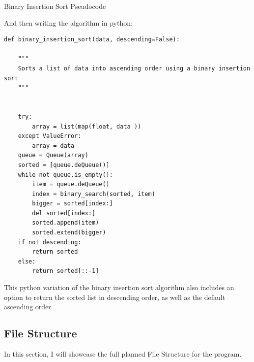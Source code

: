 \documentclass{article}
\begin{document}
\begin{algorithm}[ht]
    \caption{Binary Insertion Sort Pseudocode}
    \begin{algorithmic} [1]
            \EndWhile
        \EndFunction
    \end{algorithmic}
\end{algorithm}

And then writing the algorithm in python:

\begin{lstlisting}
def binary_insertion_sort(data, descending=False):

    """
    Sorts a list of data into ascending order using a binary insertion sort
    """


    try:
        array = list(map(float, data ))
    except ValueError:
        array = data
    queue = Queue(array)
    sorted = [queue.deQueue()]
    while not queue.is_empty():
        item = queue.deQueue()
        index = binary_search(sorted, item)
        bigger = sorted[index:]
        del sorted[index:]
        sorted.append(item)
        sorted.extend(bigger)
    if not descending:
        return sorted
    else:
        return sorted[::-1]
\end{lstlisting}

This python variation of the binary insertion sort algorithm also includes an option to return the sorted list in descending order, as well as the default ascending order.

\clearpage

\subsection{File Structure}

In this section, I will showcase the full planned File Structure for the program.
\end{document}
